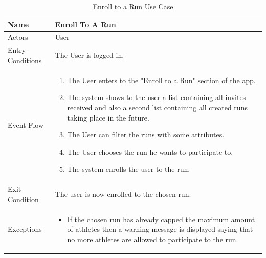 \begin{enumerate}
\FloatBarrier
\begin{table}[h]
\begin{tabular}{|p{3.4cm}|p{}|}
\hline
Name             & Enroll To A Run \\ \hline
Actors           & User  \\ \hline
Entry Conditions & The User is logged in.    \\ \hline
Event Flow       & \begin{enumerate}
            \item The User enters to the "Enroll to a Run" section of the app.
            \item The system shows to the user a list containing all invites received and also a second list containing all created runs taking place in the future.
            \item The User can filter the runs with some attributes.
            \item The User chooses the run he wants to participate to.
            \item The system enrolls the user to the run.
        \end{enumerate}\\ \hline
Exit Condition   & The user is now enrolled to the chosen run.\\ \hline
Exceptions       & \begin{itemize}
\item If the chosen run has already capped the maximum amount of athletes then a warning message is displayed saying that no more athletes are allowed to participate to the run.
\end{itemize}\\ \hline
\end{tabular}
\caption{Enroll to a Run Use Case}
\end{table}
\FloatBarrier


\end{enumerate}

